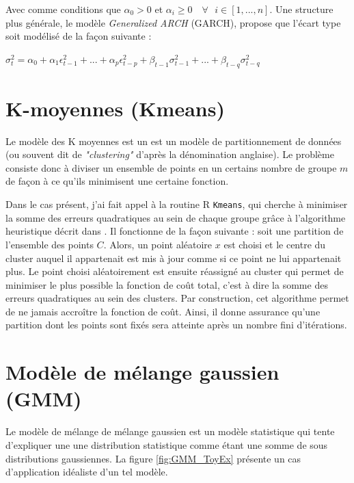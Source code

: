 \documentclass[12pt]{report}
\begin{document}
Avec comme conditions que $\alpha_0 > 0$ et $\alpha_i \geq 0 \quad \forall \text{ } i \in [1,...,n] $. Une structure plus générale, le modèle \textit{Generalized ARCH} (GARCH), propose que l’écart type soit modélisé de la façon suivante :

$ \sigma_t^2 = \alpha_0 + \alpha_1  \epsilon_{t-1}^2 + ... + \alpha_p  \epsilon_{t-p}^2
+ \beta_{t-1} \sigma^2_{t-1} + ... + \beta_{t-q} \sigma^2_{t-q}$

\section{K-moyennes (Kmeans)}
\label{sec:Kmeans}

Le modèle des K moyennes est un est un modèle de partitionnement de données (ou souvent dit de \textit{"clustering"} d'après la dénomination anglaise). Le problème consiste donc à diviser un ensemble de points en un certains nombre de groupe $m$ de façon à ce qu'ils minimisent une certaine fonction.

Dans le cas présent, j'ai fait appel à la routine R \texttt{Kmeans}, qui cherche à minimiser la somme des erreurs quadratiques au sein de chaque groupe grâce à l'algorithme heuristique décrit dans \cite{hartigan_algorithm_1979}. Il fonctionne de la façon suivante : soit une partition de l'ensemble des points $C$. Alors, un point aléatoire $x$ est choisi et le centre du cluster auquel il appartenait est mis à jour comme si ce point ne lui appartenait plus. Le point choisi aléatoirement est ensuite réassigné au cluster qui permet de minimiser le plus possible la fonction de coût total, c'est à dire la somme des erreurs quadratiques au sein des clusters. Par construction, cet algorithme permet de ne jamais accroître la fonction de coût. Ainsi, il donne assurance qu'une partition dont les points sont fixés sera atteinte après un nombre fini d'itérations.

\section{Modèle de mélange gaussien (GMM)}
\label{sec:Model_GMM}
Le modèle de mélange de mélange gaussien est un modèle statistique qui tente d'expliquer une une distribution statistique comme étant une somme de sous distributions gaussiennes. La figure \ref{fig:GMM_ToyEx} présente un cas d'application idéaliste d'un tel modèle. 
\end{document}
